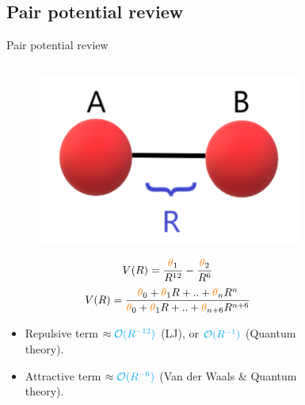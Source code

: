 \documentclass{beamer}
\begin{document}
\subsection{Pair potential review}
\begin{frame}{Pair potential review}
    \fontsize{9}{6}\selectfont
    \begin{columns}
        \begin{column}{0.5\textwidth}
            \begin{figure}[H]
                \centering
                    \includegraphics[scale=0.25]{img/slide/atompair.png}
                \label{fig:ozone}
            \end{figure}
            \begin{equation}
                V(R) = \frac{{\color{orange}\theta}_1}{R^{12}} - \frac{{\color{orange}\theta}_2}{R^{6}}
            \end{equation}
            \begin{equation}
                V(R) = \frac{{\color{orange}\theta}_0 + {\color{orange}\theta}_1R + .. + {\color{orange}\theta}_nR^n}{{\color{orange}\theta}_0 + {\color{orange}\theta}_1R + .. + {\color{orange}\theta}_{n+6}R^{n+6}}
            \end{equation}
            \begin{itemize}
                \item Repulsive term $\approx {\color{cyan}\mathcal{O}(R^{-12})}$ (LJ), or ${\color{cyan}\mathcal{O}(R^{-1})}$ (Quantum theory).
                \item Attractive term $\approx {\color{cyan}\mathcal{O}(R^{-6})}$ (Van der Waals \& Quantum theory).
            \end{itemize}
        \end{column}
        \begin{column}{0.5\textwidth}
            \begin{figure}[htbp]
                \centering

\end{figure}
\end{column}
\end{columns}
\end{frame}
\end{document}
